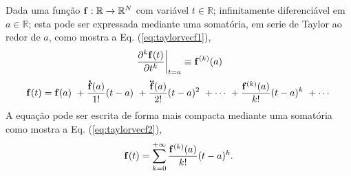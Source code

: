 \begin{proposition}\label{prop:taylorvecf}
Dada uma função $\VECTOR{f}:\mathbb{R}\rightarrow \mathbb{R}^{N}$ com variável $t \in \mathbb{R}$;
infinitamente diferenciável em $a \in \mathbb{R}$;
esta pode ser expressada mediante uma somatória, em serie de Taylor 
\cite[pp. 264]{joag2016introduction}
ao redor de $a$, como
mostra a Eq. (\ref{eq:taylorvecf1}),
\begin{equation}\label{eq:taylorvecf0a}
\left.\frac{\partial^k \VECTOR{f}(t)}{\partial t^k}\right|_{t=a}\equiv \VECTOR{f}^{(k)}(a) 
\end{equation}
\begin{equation}\label{eq:taylorvecf1}
  \VECTOR{f}(t)=\VECTOR{f}(a)
      ~+\frac{\DTVECTOR{f}(a)}{1!} (t-a)
      ~+\frac{\DDTVECTOR{f}(a)}{2!} (t-a)^{2}
      ~+\cdots 
      ~+\frac{\VECTOR{f}^{(k)}(a)}{k!} (t-a)^{k}
      ~+\cdots 
\end{equation}
A equação pode ser escrita de forma mais compacta mediante uma somatória  como mostra a Eq. (\ref{eq:taylorvecf2}),
\begin{equation}\label{eq:taylorvecf2}
  \VECTOR{f}(t)=\sum\limits_{k=0}^{+\infty} \frac{\VECTOR{f}^{(k)}(a)}{k!} (t-a)^{k}.
\end{equation}
\end{proposition}

